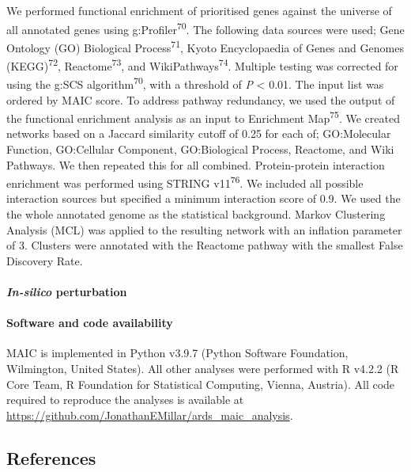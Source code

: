 \documentclass[
  11,
  a4paper,
]{article}
\let\oldparagraph\paragraph
\renewcommand{\paragraph}[1]{\oldparagraph{#1}\mbox{}}
\begin{document}
We performed functional enrichment of prioritised genes against the
universe of all annotated genes using g:Profiler\textsuperscript{70}.
The following data sources were used; Gene Ontology (GO) Biological
Process\textsuperscript{71}, Kyoto Encyclopaedia of Genes and Genomes
(KEGG)\textsuperscript{72}, Reactome\textsuperscript{73}, and
WikiPathways\textsuperscript{74}. Multiple testing was corrected for
using the g:SCS algorithm\textsuperscript{70}, with a threshold of
\emph{P} \textless{} 0.01. The input list was ordered by MAIC score. To
address pathway redundancy, we used the output of the functional
enrichment analysis as an input to Enrichment Map\textsuperscript{75}.
We created networks based on a Jaccard similarity cutoff of 0.25 for
each of; GO:Molecular Function, GO:Cellular Component, GO:Biological
Process, Reactome, and Wiki Pathways. We then repeated this for all
combined. Protein-protein interaction enrichment was performed using
STRING v11\textsuperscript{76}. We included all possible interaction
sources but specified a minimum interaction score of 0.9. We used the
the whole annotated genome as the statistical background. Markov
Clustering Analysis (MCL) was applied to the resulting network with an
inflation parameter of 3. Clusters were annotated with the Reactome
pathway with the smallest False Discovery Rate.

\hypertarget{in-silico-perturbation-1}{%
\paragraph{\texorpdfstring{\emph{In-silico}
perturbation}{In-silico perturbation}}\label{in-silico-perturbation-1}}

\hypertarget{software-and-code-availability}{%
\paragraph{Software and code
availability}\label{software-and-code-availability}}

MAIC is implemented in Python v3.9.7 (Python Software Foundation,
Wilmington, United States). All other analyses were performed with R
v4.2.2 (R Core Team, R Foundation for Statistical Computing, Vienna,
Austria). All code required to reproduce the analyses is available at
\url{https://github.com/JonathanEMillar/ards_maic_analysis}.

\newpage

\hypertarget{references}{%
\subsection{References}\label{references}}
\end{document}

